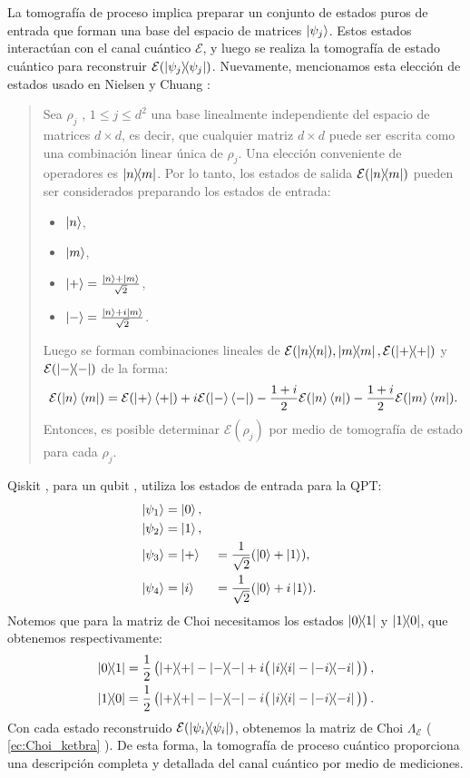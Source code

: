 \documentclass[letterpaper,12pt]{thesisECFM}
\theoremstyle{plain}
\theoremstyle{definition}
\theoremstyle{definition}
\theoremstyle{remark}
\newcommand{\1}{\mathbb{1}}
\begin{document}
La tomografía de proceso implica preparar un conjunto de estados puros de entrada que forman una base del espacio de matrices $\ket{\psi_j}$. Estos estados interactúan con el canal cuántico $\mathcal{E}$, y luego se realiza la tomografía de estado cuántico para reconstruir $\mathcal{E}(\ketbra{\psi_j}{\psi_j})$. Nuevamente, mencionamos esta elección de estados usado en Nielsen y Chuang \cite{nielsen_chuang_2011}: 
\begin{quote}
Sea $\rho_j$ , $1\leq j \leq d^2$ una base linealmente independiente del espacio de matrices $d\times d$, es decir, que cualquier matriz $d \times d$ puede ser escrita como una combinación linear única de $\rho_j$.  Una elección conveniente de operadores es $\ketbra{n}{m}$. Por lo tanto, los estados de salida $\mathcal{E}(\ketbra{n}{m})$ pueden ser considerados preparando los estados de entrada:
\begin{itemize}
    \item$\ket{n}$,
    \item$\ket{m}$,
    \item$\ket{+} = \frac{\ket{n} + \ket{m}}{\sqrt{2}}$,
    \item$\ket{-} = \frac{\ket{n} + i\ket{m}}{\sqrt{2}}$.
\end{itemize}
Luego se forman combinaciones lineales de $\mathcal{E} (\ketbra{n}), \ketbra{m},\mathcal{E}(\ketbra{+})$ y $\mathcal{E}(\ketbra{-})$ de la forma:
\begin{equation}
    \mathcal{E}(\ket{n}\bra{m}) = \mathcal{E}(\ket{+}\bra{+}) + i \mathcal{E}(\ket{-}\bra{-}) - \frac{1 + i}{2} \mathcal{E}(\ket{n}\bra{n}) - \frac{1 + i}{2} \mathcal{E}(\ket{m}\bra{m}).
\end{equation}
Entonces, es posible determinar $\mathcal{E}(\rho_j)$ por medio de tomografía de estado para cada $\rho_j$.
\end{quote}

Qiskit , para un qubit , utiliza los estados de entrada para la QPT:
\begin{alignat}{2}
    \ket{\psi_1} &= \ket{0}, \\
    \ket{\psi_2} &= \ket{1}, \\
    \ket{\psi_3} &= \ket{+} &&= \frac{1}{\sqrt{2}}(\ket{0} + \ket{1}), \\
    \ket{\psi_4} &= \ket{i} &&= \frac{1}{\sqrt{2}}(\ket{0} + i\ket{1}).
\end{alignat}
Notemos que para la matriz de Choi necesitamos los estados $\ketbra{0}{1}$ y $\ketbra{1}{0}$, que obtenemos respectivamente:
\begin{alignat}{1}
    \ketbra{0}{1} &= \frac{1}{2} \left( \ketbra{+}{+} - \ketbra{-}{-} + i \big( \ketbra{i}{i} - \ketbra{-i}{-i} \big) \right), \\
    \ketbra{1}{0} &= \frac{1}{2} \left( \ketbra{+}{+} - \ketbra{-}{-} - i \big( \ketbra{i}{i} - \ketbra{-i}{-i} \big) \right).
\end{alignat}
Con cada estado reconstruido $\mathcal{E}(\ketbra{\psi_i})$,  obtenemos la matriz de Choi $\Lambda_{\mathcal{E}}$ ( \ref{ec:Choi_ketbra} ). De esta forma, la tomografía de proceso cuántico proporciona una descripción completa y detallada del canal cuántico por medio de mediciones. 
\end{document}
